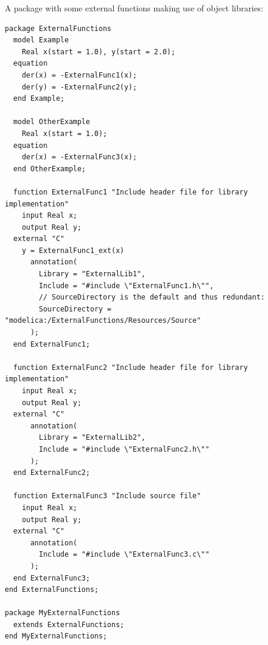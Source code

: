 \begin{example}
A package with some external functions making use of object libraries:
\begin{lstlisting}[language=modelica]
package ExternalFunctions
  model Example
    Real x(start = 1.0), y(start = 2.0);
  equation
    der(x) = -ExternalFunc1(x);
    der(y) = -ExternalFunc2(y);
  end Example;

  model OtherExample
    Real x(start = 1.0);
  equation
    der(x) = -ExternalFunc3(x);
  end OtherExample;

  function ExternalFunc1 "Include header file for library implementation"
    input Real x;
    output Real y;
  external "C"
    y = ExternalFunc1_ext(x)
      annotation(
        Library = "ExternalLib1",
        Include = "#include \"ExternalFunc1.h\"",
        // SourceDirectory is the default and thus redundant:
        SourceDirectory = "modelica:/ExternalFunctions/Resources/Source"
      );
  end ExternalFunc1;

  function ExternalFunc2 "Include header file for library implementation"
    input Real x;
    output Real y;
  external "C"
      annotation(
        Library = "ExternalLib2",
        Include = "#include \"ExternalFunc2.h\""
      );
  end ExternalFunc2;

  function ExternalFunc3 "Include source file"
    input Real x;
    output Real y;
  external "C"
      annotation(
        Include = "#include \"ExternalFunc3.c\""
      );
  end ExternalFunc3;
end ExternalFunctions;

package MyExternalFunctions
  extends ExternalFunctions;
end MyExternalFunctions;
\end{lstlisting}


\end{example}
